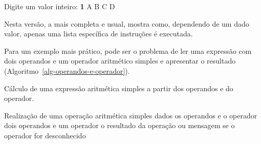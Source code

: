 \documentclass[
  11pt,
  a4paper,
]{scrbook}
\newenvironment{Shaded}{\begin{snugshade}}{\end{snugshade}}
\newcommand{\KeywordTok}[1]{\textcolor[rgb]{0.13,0.29,0.53}{\textbf{#1}}}
\newcommand{\NormalTok}[1]{#1}
\begin{document}
\begin{Shaded}
\begin{Highlighting}[]
\NormalTok{Digite um valor inteiro: }\KeywordTok{ 1 }
\NormalTok{A}
\NormalTok{B}
\NormalTok{C}
\NormalTok{D}
\end{Highlighting}
\end{Shaded}

Nesta versão, a mais completa e usual, mostra como, dependendo de um
dado valor, apenas uma lista específica de instruções é executada.

Para um exemplo mais prático, pode ser o problema de ler uma expressão
com dois operandos e um operador aritmético simples e apresentar o
resultado (Algoritmo~\ref{alg-operandos-e-operador}).

\begin{algorithm}[H]
\caption{\label{alg-operandos-e-operador}Cálculo de uma expressão
aritmética simples a partir dos operandos e do operador.}
\begingroup%


\begin{algorithmic}
    \Description Realização de uma operação aritmética simples dados os operandos e o operador
    \Require dois operandos e um operador
    \Ensure o resultado da operação ou mensagem se o operador for desconhecido
    \Statex{}
    \Statex
    \Else
    \EndIf
    \Statex
    \Else
    \EndIf

\end{algorithmic}

\endgroup
\end{algorithm}
\end{document}
